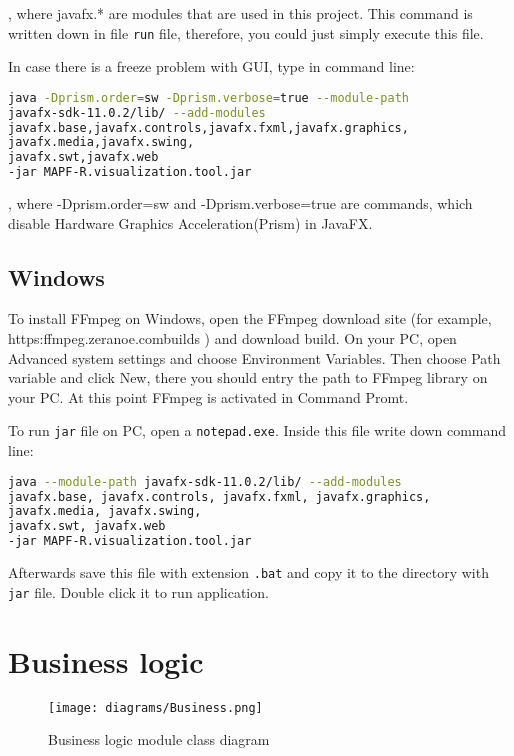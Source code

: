 \documentclass[thesis=B,english]{FITthesis}[2019/12/23]
\begin{document}
, where javafx.* are modules that are used in this project. This command is written down in file \verb|run| file, therefore, you could just simply execute this file.

In case there is a freeze problem with GUI, type in command line:
\begin{lstlisting}[language=bash]
java -Dprism.order=sw -Dprism.verbose=true --module-path 
javafx-sdk-11.0.2/lib/ --add-modules  
javafx.base,javafx.controls,javafx.fxml,javafx.graphics,
javafx.media,javafx.swing,
javafx.swt,javafx.web 
-jar MAPF-R.visualization.tool.jar
\end{lstlisting}

, where -Dprism.order=sw and -Dprism.verbose=true are commands, which disable Hardware Graphics Acceleration(Prism) in JavaFX. 



\subsection{Windows}

To install FFmpeg on Windows, open the FFmpeg download site (for example,  https:\/\/ffmpeg.zeranoe.com\/builds\/ ) and download build. On your PC, open Advanced system settings and choose Environment Variables. Then choose Path variable and click New, there you should entry the path to FFmpeg library on your PC. At this point FFmpeg is activated in Command Promt.

To run \verb|jar| file on PC, open a \verb|notepad.exe|. Inside this file write down command line:
\begin{lstlisting}[language=bash]
java --module-path javafx-sdk-11.0.2/lib/ --add-modules 
javafx.base, javafx.controls, javafx.fxml, javafx.graphics, 
javafx.media, javafx.swing, 
javafx.swt, javafx.web
-jar MAPF-R.visualization.tool.jar
\end{lstlisting}   

Afterwards save this file with extension \verb|.bat| and copy it to the directory with \verb|jar| file. Double click it to run application. 

\section{Business logic}

\begin{figure}
	\texttt{[image: diagrams/Business.png]}
	\caption[Business logic module class diagram]{Business logic module class diagram}\label{fig:float13}
\end{figure}
\end{document}

